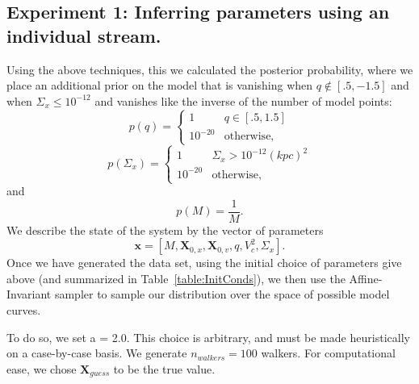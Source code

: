 \documentclass[12pt,preprint]{aastex}
\theoremstyle{plain}
\theoremstyle{definition}
\newcommand{\mtensor}[1]{\boldsymbol{#1}}
\newcommand{\mvector}[1]{\mtensor{#1}}
\newcommand{\vx}{\mvector{x}}
\newcommand{\vX}{\mvector{X}}
\begin{document}
\subsection{\label{sec:Experiment1} Experiment 1: Inferring parameters using an individual stream.}

Using the above techniques, this we calculated the
posterior probability, where we place an additional prior on the model that is vanishing when $q \notin [.5,-1.5]$ and when $\Sigma_x \leq 10^{-12}$ 
and vanishes like the inverse of the number of model points:
\begin{equation}\displaystyle
p(q) = \left\{ \begin{array}{cl}  1 & q \in [.5,1.5] \\
				 10^{-20} & \text{otherwise,} 
\end{array}
\right.
\end{equation}
\begin{equation}\displaystyle
p(\Sigma_x) = \left\{ \begin{array}{cl} 1 & \Sigma_x > 10^{-12} (kpc)^2 \\
							10^{-20} &\text{otherwise,}
\end{array}
\right.
\end{equation}
and
\begin{equation}\displaystyle
p(M) = \frac{1}{M}.
\end{equation}
We describe the state of the system by the vector of parameters 
\[
\vx = [ M, \vX_{0,x}, \vX_{0,v}, q, V_c^2, \Sigma_x]. 
\] 
Once we have generated the data set, using the initial choice of
parameters give above (and summarized in Table~\ref{table:InitConds}), we then use
the Affine-Invariant sampler to sample our distribution over the space
of possible model curves. 

To do so, we set a = 2.0. This choice is arbitrary, and must be made heuristically
on a case-by-case basis. We generate $n_{walkers} = 100$ walkers. For computational ease, we chose $\vX_{guess}$ to be the true value. 
\end{document}
